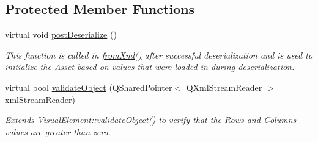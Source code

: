 \subsection*{Protected Member Functions}
\begin{DoxyCompactItemize}
\item 
virtual void \hyperlink{class_picto_1_1_grid_graphic_aafa2aa763c403ab8f6bbec220683ebe0}{post\-Deserialize} ()
\begin{DoxyCompactList}\small\item\em This function is called in \hyperlink{class_picto_1_1_asset_a8bed4da09ecb1c07ce0dab313a9aba67}{from\-Xml()} after successful deserialization and is used to initialize the \hyperlink{class_picto_1_1_asset}{Asset} based on values that were loaded in during deserialization. \end{DoxyCompactList}\item 
\hypertarget{class_picto_1_1_grid_graphic_a26c4ce421e3c198a3c4698f2bd86d1fd}{virtual bool \hyperlink{class_picto_1_1_grid_graphic_a26c4ce421e3c198a3c4698f2bd86d1fd}{validate\-Object} (Q\-Shared\-Pointer$<$ Q\-Xml\-Stream\-Reader $>$ xml\-Stream\-Reader)}\label{class_picto_1_1_grid_graphic_a26c4ce421e3c198a3c4698f2bd86d1fd}

\begin{DoxyCompactList}\small\item\em Extends \hyperlink{struct_picto_1_1_visual_element_a681b115b3f3ea6d24ab803cab9d6ee5b}{Visual\-Element\-::validate\-Object()} to verify that the Rows and Columns values are greater than zero. \end{DoxyCompactList}\end{DoxyCompactItemize}
